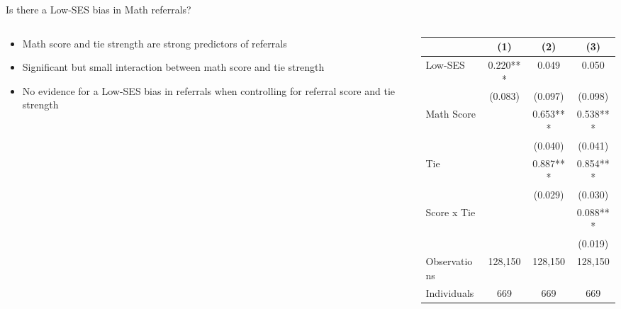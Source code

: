 \documentclass[aspectratio=169,xcolor=dvipsnames]{beamer}
\begin{document}
\begin{frame}{Is there a Low-SES bias in Math referrals?}
    \begin{columns}[T]
        \begin{column}{0.38\textwidth}
            \vspace{2em}
            \begin{itemize}
                \item Math score and tie strength are strong predictors of referrals
                \item Significant but small interaction between math score and tie strength
                \item No evidence for a Low-SES bias in referrals when controlling for referral score and tie strength
            \end{itemize}
        \end{column}
        \begin{column}{0.62\textwidth}
            \begin{table}
                \centering
                \footnotesize
                \begin{threeparttable}
                \begin{tabular*}{0.9\columnwidth}{@{\extracolsep{\fill}}lccc}
                \toprule
                 & \multicolumn{1}{c}{(1)} & \multicolumn{1}{c}{(2)} & \multicolumn{1}{c}{(3)} \\
                \midrule
                Low-SES & 0.220*** & 0.049 & 0.050 \\
                 & (0.083) & (0.097) & (0.098) \\
                Math Score  &  & 0.653*** & 0.538*** \\
                 &  & (0.040) & (0.041) \\
                Tie &  & 0.887*** & 0.854*** \\
                 &  & (0.029) & (0.030) \\
                Score x Tie &  &  & 0.088*** \\
                 &  &  & (0.019) \\
                \midrule
                Observations & 128,150 & 128,150 & 128,150 \\
                Individuals & 669 & 669 & 669 \\
                \bottomrule
                \end{tabular*}
                \label{tab:math_regression}
                \end{threeparttable}
            \end{table}
        \end{column}
    \end{columns}
\end{frame}
\end{document}
